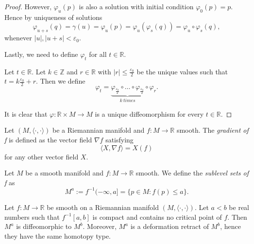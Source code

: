 \begin{proof}
    However, $\varphi_u(p)$ is also a solution with initial condition $\varphi_0(p)=p$. Hence by uniqueness of solutions
    \begin{equation*}
        \varphi_{u+s}(q)=\gamma(u)=\varphi_u(p)=\varphi_u(\varphi_s(q))=\varphi_u\circ \varphi_s(q),
    \end{equation*}
    whenever $|u|, |u+s|<\varepsilon_0$.

    Lastly, we need to define $\varphi_t$ for all $t\in \mathbb{R}$.

    Let $t\in \mathbb{R}$. Let $k\in \mathbb{Z}$ and $r\in \mathbb{R}$ with $|r|\le \frac{\varepsilon_0}{2}$ be the unique values such that $t=k\frac{\varepsilon_0}{2}+r$. Then we define
    \begin{equation*}
        \varphi_t=\underbrace{\varphi_{\frac{\varepsilon_0}{2}}\circ \dots \circ \varphi_{\frac{\varepsilon_0}{2}}}_{k~times}\circ \varphi_r.
    \end{equation*}

    It is clear that $\varphi:\mathbb{R}\times M\to M$ is a unique diffeomorphism for every $t\in \mathbb{R}$.

\end{proof}

\begin{definition}
    Let $(M,\langle\cdot,\cdot\rangle)$ be a Riemannian manifold and $f:M\to\mathbb{R}$ smooth. The \textit{gradient of f} is defined as the vector field $\nabla f$ satisfying
    \begin{equation*}
        \langle X,\nabla f\rangle = X(f)
    \end{equation*}
    for any other vector field $X$.
\end{definition}
\bigskip

\begin{definition}
    Let $M$ be a smooth manifold and $f:M\to\mathbb{R}$ smooth. We define the \textit{sublevel sets of f} as
    \begin{equation*}
        M^a := f^{-1}(-\infty,a] =\{p\in M: f(p)\le a\}.
    \end{equation*}
\end{definition}

\begin{theorem}
\label{retractodef}
    Let $f:M\to\mathbb{R}$ be smooth on a Riemannian manifold $(M,\langle\cdot,\cdot\rangle)$. Let $a<b$ be real numbers such that $f^{-1}[a,b]$ is compact and contains no critical point of $f$. Then $M^a$ is diffeomorphic to $M^b$. Moreover, $M^a$ is a deformation retract of $M^b$, hence they have the same homotopy type.
\end{theorem}

